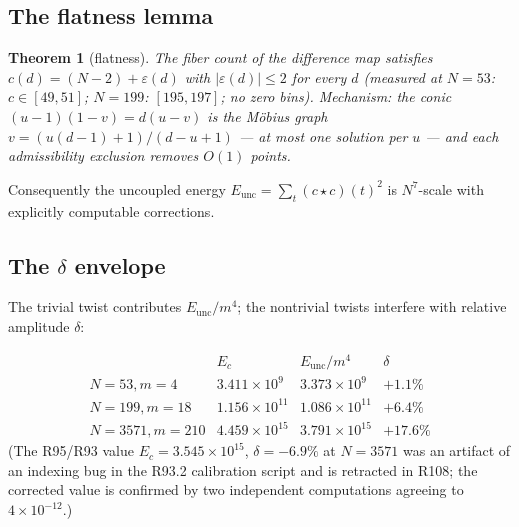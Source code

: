\documentclass[11pt,reqno]{amsart}
\newtheorem{theorem}{Theorem}[section]
\theoremstyle{definition}
\begin{document}
\subsection{The flatness lemma}

\begin{theorem}[flatness]
\label{thm:flatness}
The fiber count of the difference map satisfies
$c(d) = (N{-}2) + \varepsilon(d)$ with $|\varepsilon(d)| \le 2$ for
every $d$ (measured at $N = 53$: $c \in [49,51]$; $N = 199$:
$[195,197]$; no zero bins).  Mechanism: the conic
$(u{-}1)(1{-}v) = d(u{-}v)$ is the M\"obius graph
$v = (u(d{-}1)+1)/(d{-}u+1)$ — at most one solution per $u$ — and each
admissibility exclusion removes $O(1)$ points.
\end{theorem}

Consequently the uncoupled energy $E_{\mathrm{unc}} =
\sum_t (c \star c)(t)^2$ is $N^7$-scale with explicitly computable
corrections.

\subsection{The \texorpdfstring{$\delta$}{delta} envelope}

The trivial twist contributes $E_{\mathrm{unc}}/m^4$; the nontrivial
twists interfere with relative amplitude $\delta$:

\[
\begin{array}{lccc}
 & E_c & E_{\mathrm{unc}}/m^4 & \delta\\
N = 53, m = 4 & 3.411 \times 10^9 & 3.373 \times 10^9 & +1.1\%\\
N = 199, m = 18 & 1.156 \times 10^{11} & 1.086 \times 10^{11} & +6.4\%\\
N = 3571, m = 210 & 4.459 \times 10^{15} & 3.791 \times 10^{15} & +17.6\%
\end{array}
\]
(The R95/R93 value $E_c = 3.545 \times 10^{15}$, $\delta = -6.9\%$ at
$N = 3571$ was an artifact of an indexing bug in the R93.2 calibration
script and is retracted in R108; the corrected value is confirmed by two
independent computations agreeing to $4 \times 10^{-12}$.)
\end{document}
